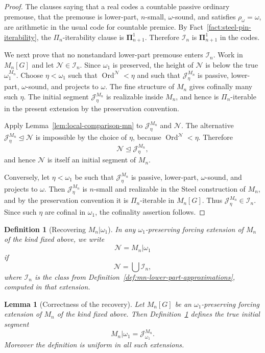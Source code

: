 \documentclass[a4paper,11pt]{article}
\newtheorem{lemma}[theorem]{Lemma}
\newtheorem{definition}[theorem]{Definition}
\begin{document}
\begin{proof}
The clauses saying that a real codes a countable passive ordinary premouse, that the premouse is lower-part, $n$-small, $\omega$-sound, and satisfies $\rho_\omega=\omega$, are arithmetic in the usual code for countable premice.  By Fact~\ref{fact:steel-pin-iterability}, the $\Pi_n$-iterability clause is $\boldsymbol\Pi^1_{n+1}$.  Therefore $\mathcal I_n$ is $\boldsymbol\Pi^1_{n+1}$ in the codes.

We next prove that no nonstandard lower-part premouse enters $\mathcal I_n$.  Work in $M_n[G]$ and let $\mathcal N\in\mathcal I_n$.  Since $\omega_1$ is preserved, the height of $\mathcal N$ is below the true $\omega_1^{M_n}$.  Choose $\eta<\omega_1$ such that $\operatorname{Ord}^{\mathcal N}<\eta$ and such that $\mathcal J^{M_n}_\eta$ is passive, lower-part, $\omega$-sound, and projects to $\omega$.  The fine structure of $M_n$ gives cofinally many such $\eta$.  The initial segment $\mathcal J^{M_n}_\eta$ is realizable inside $M_n$, and hence is $\Pi_n$-iterable in the present extension by the preservation convention.

Apply Lemma~\ref{lem:local-comparison-mn} to $\mathcal J^{M_n}_\eta$ and $\mathcal N$.  The alternative $\mathcal J^{M_n}_\eta\trianglelefteq\mathcal N$ is impossible by the choice of $\eta$, because $\operatorname{Ord}^{\mathcal N}<\eta$.  Therefore
\[
   \mathcal N\trianglelefteq \mathcal J^{M_n}_\eta,
\]
and hence $\mathcal N$ is itself an initial segment of $M_n$.

Conversely, let $\eta<\omega_1$ be such that $\mathcal J^{M_n}_\eta$ is passive, lower-part, $\omega$-sound, and projects to $\omega$.  Then $\mathcal J^{M_n}_\eta$ is $n$-small and realizable in the Steel construction of $M_n$, and by the preservation convention it is $\Pi_n$-iterable in $M_n[G]$.  Thus $\mathcal J^{M_n}_\eta\in\mathcal I_n$.  Since such $\eta$ are cofinal in $\omega_1$, the cofinality assertion follows.
\end{proof}

\begin{definition}[Recovering $M_n|\omega_1$]\label{def:recover-mn-omega1}
In any $\omega_1$-preserving forcing extension of $M_n$ of the kind fixed above, we write
\[
   \mathcal N=M_n|\omega_1
\]
if
\[
   \mathcal N=\bigcup\mathcal I_n,
\]
where $\mathcal I_n$ is the class from Definition~\ref{def:mn-lower-part-approximations}, computed in that extension.
\end{definition}

\begin{lemma}[Correctness of the recovery]\label{lem:recover-mn-omega1}
Let $M_n[G]$ be an $\omega_1$-preserving forcing extension of $M_n$ of the kind fixed above.  Then Definition~\ref{def:recover-mn-omega1} defines the true initial segment
\[
   M_n|\omega_1=\mathcal J^{M_n}_{\omega_1}.
\]
Moreover the definition is uniform in all such extensions.
\end{lemma}
\end{document}
